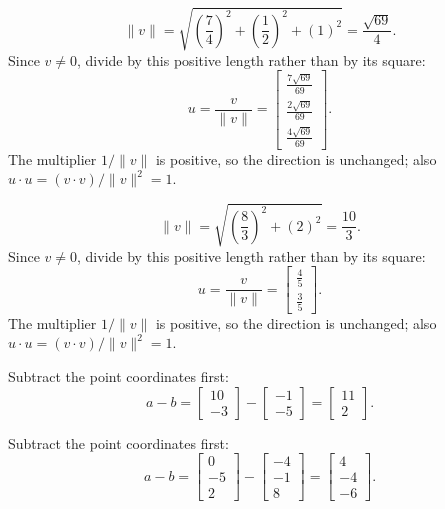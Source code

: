 \[\|v\|=\sqrt{(\frac{7}{4})^2+(\frac{1}{2})^2+(1)^2}=\frac{\sqrt{69}}{4}.\]
Since $v\ne0$, divide by this positive length rather than by its square:
\[u=\frac{v}{\|v\|}=\left[\begin{array}{r}\frac{7 \sqrt{69}}{69}\\\frac{2 \sqrt{69}}{69}\\\frac{4 \sqrt{69}}{69}\end{array}\right].\]
The multiplier $1/\|v\|$ is positive, so the direction is unchanged; also $u\cdot u=(v\cdot v)/\|v\|^2=1$.

\[\|v\|=\sqrt{(\frac{8}{3})^2+(2)^2}=\frac{10}{3}.\]
Since $v\ne0$, divide by this positive length rather than by its square:
\[u=\frac{v}{\|v\|}=\left[\begin{array}{r}\frac{4}{5}\\\frac{3}{5}\end{array}\right].\]
The multiplier $1/\|v\|$ is positive, so the direction is unchanged; also $u\cdot u=(v\cdot v)/\|v\|^2=1$.

Subtract the point coordinates first:
\[a-b=\left[\begin{array}{r}10\\-3\end{array}\right]-\left[\begin{array}{r}-1\\-5\end{array}\right]=\left[\begin{array}{r}11\\2\end{array}\right].\]

Subtract the point coordinates first:
\[a-b=\left[\begin{array}{r}0\\-5\\2\end{array}\right]-\left[\begin{array}{r}-4\\-1\\8\end{array}\right]=\left[\begin{array}{r}4\\-4\\-6\end{array}\right].\]

